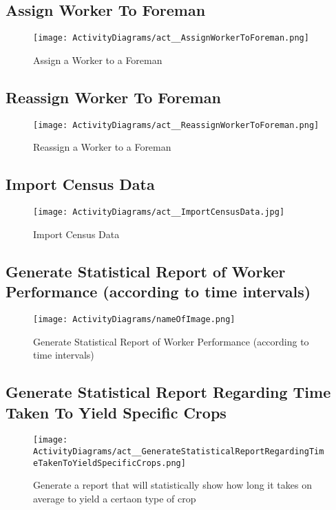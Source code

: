 \documentclass[11pt,fleqn]{book} %
\begin{document}
\subsection{Assign Worker To Foreman}
\begin{figure}
	\texttt{[image: ActivityDiagrams/act\_\_AssignWorkerToForeman.png]}
	\caption{Assign a Worker to a Foreman}
\end{figure}

\subsection{Reassign Worker To Foreman}
\begin{figure}
	\texttt{[image: ActivityDiagrams/act\_\_ReassignWorkerToForeman.png]}
	\caption{Reassign a Worker to a Foreman}
\end{figure}

\subsection{Import Census Data}
\begin{figure}
	\texttt{[image: ActivityDiagrams/act\_\_ImportCensusData.jpg]}
	\caption{Import Census Data}
\end{figure}

\subsection{Generate Statistical Report of Worker Performance (according to time intervals)}
\begin{figure}
	\texttt{[image: ActivityDiagrams/nameOfImage.png]}
	\caption{Generate Statistical Report of Worker Performance (according to time intervals)}
\end{figure}

\subsection{Generate Statistical Report Regarding Time Taken To Yield Specific Crops}
\begin{figure}
	\texttt{[image: ActivityDiagrams/act\_\_GenerateStatisticalReportRegardingTimeTakenToYieldSpecificCrops.png]}
	\caption{Generate a report that will statistically show how long it takes on average to yield a certaon type of crop}
\end{figure}
\newpage
\end{document}
